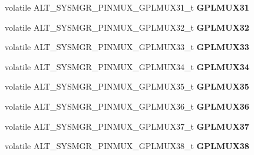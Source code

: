\begin{DoxyCompactItemize}
volatile A\+L\+T\+\_\+\+S\+Y\+S\+M\+G\+R\+\_\+\+P\+I\+N\+M\+U\+X\+\_\+\+G\+P\+L\+M\+U\+X31\+\_\+t {\bfseries G\+P\+L\+M\+U\+X31}
\item 
\mbox{\label{structALT__SYSMGR__PINMUX__s_a6fe0eb40c923252dea58700bf68fabd5}} 
volatile A\+L\+T\+\_\+\+S\+Y\+S\+M\+G\+R\+\_\+\+P\+I\+N\+M\+U\+X\+\_\+\+G\+P\+L\+M\+U\+X32\+\_\+t {\bfseries G\+P\+L\+M\+U\+X32}
\item 
\mbox{\label{structALT__SYSMGR__PINMUX__s_a2f115b53a3c4dce3d9471e764a38af85}} 
volatile A\+L\+T\+\_\+\+S\+Y\+S\+M\+G\+R\+\_\+\+P\+I\+N\+M\+U\+X\+\_\+\+G\+P\+L\+M\+U\+X33\+\_\+t {\bfseries G\+P\+L\+M\+U\+X33}
\item 
\mbox{\label{structALT__SYSMGR__PINMUX__s_ad9d8003b9bb1853505eeda9f765805bc}} 
volatile A\+L\+T\+\_\+\+S\+Y\+S\+M\+G\+R\+\_\+\+P\+I\+N\+M\+U\+X\+\_\+\+G\+P\+L\+M\+U\+X34\+\_\+t {\bfseries G\+P\+L\+M\+U\+X34}
\item 
\mbox{\label{structALT__SYSMGR__PINMUX__s_ac5f6882c8116cca03d6f8b0f13a2f3fd}} 
volatile A\+L\+T\+\_\+\+S\+Y\+S\+M\+G\+R\+\_\+\+P\+I\+N\+M\+U\+X\+\_\+\+G\+P\+L\+M\+U\+X35\+\_\+t {\bfseries G\+P\+L\+M\+U\+X35}
\item 
\mbox{\label{structALT__SYSMGR__PINMUX__s_a2ddce6ce02c3b66d72e031f22a3d16b2}} 
volatile A\+L\+T\+\_\+\+S\+Y\+S\+M\+G\+R\+\_\+\+P\+I\+N\+M\+U\+X\+\_\+\+G\+P\+L\+M\+U\+X36\+\_\+t {\bfseries G\+P\+L\+M\+U\+X36}
\item 
\mbox{\label{structALT__SYSMGR__PINMUX__s_af1fcfdfac9d5b5bf7b4fd978bc560b21}} 
volatile A\+L\+T\+\_\+\+S\+Y\+S\+M\+G\+R\+\_\+\+P\+I\+N\+M\+U\+X\+\_\+\+G\+P\+L\+M\+U\+X37\+\_\+t {\bfseries G\+P\+L\+M\+U\+X37}
\item 
\mbox{\label{structALT__SYSMGR__PINMUX__s_adbc3683445da493149949a746d15ee70}} 
volatile A\+L\+T\+\_\+\+S\+Y\+S\+M\+G\+R\+\_\+\+P\+I\+N\+M\+U\+X\+\_\+\+G\+P\+L\+M\+U\+X38\+\_\+t {\bfseries G\+P\+L\+M\+U\+X38}
\item 
\mbox{\label{structALT__SYSMGR__PINMUX__s_a9694c3bc47416bae07caeba0b27c4975}} 

\end{DoxyCompactItemize}
